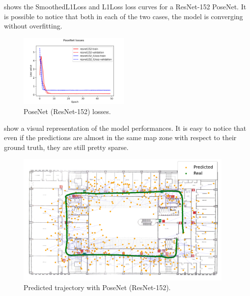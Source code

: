  shows the SmoothedL1Loss and L1Loss loss curves for a ResNet-152 PoseNet. It is possible to notice that both in each of the two cases, the model is converging without overfitting.
\begin{figure}[htbp]
    \begin{center}
        \includegraphics[width=0.48\textwidth]{./imgs/posenet_losses.png}
    \end{center}
    \caption{PoseNet (ResNet-152) losses.}
    \label{fig:posenet-losses}
\end{figure}

 show a visual representation of the model performances. It is easy to notice that even if the predictions are almost in the same map zone with respect to their ground truth, they are still pretty sparse.
\begin{figure}[htbp]
    \begin{center}
        \includegraphics[width=0.95\textwidth]{./imgs/posenet_map.png}
    \end{center}
    \caption{Predicted trajectory with PoseNet (ResNet-152).}
    \label{fig:trajectory-posenet}
\end{figure}

